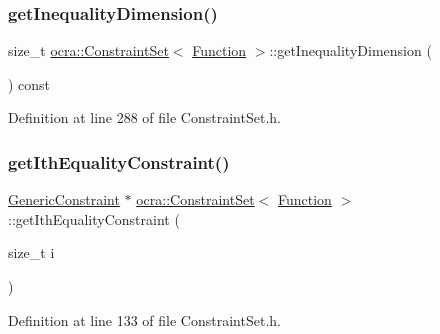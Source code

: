 \subsubsection{\texorpdfstring{get\+Inequality\+Dimension()}{getInequalityDimension()}}
{\footnotesize\ttfamily size\+\_\+t \hyperlink{classocra_1_1ConstraintSet}{ocra\+::\+Constraint\+Set}$<$ \hyperlink{classocra_1_1Function}{Function} $>$\+::get\+Inequality\+Dimension (\begin{DoxyParamCaption}{ }\end{DoxyParamCaption}) const\hspace{0.3cm}{\ttfamily [inline]}}



Definition at line 288 of file Constraint\+Set.\+h.

\hypertarget{classocra_1_1ConstraintSet_3_01Function_01_4_a376c4fe9b26afe70f176c2913fb870f0}{}\label{classocra_1_1ConstraintSet_3_01Function_01_4_a376c4fe9b26afe70f176c2913fb870f0} 
\subsubsection{\texorpdfstring{get\+Ith\+Equality\+Constraint()}{getIthEqualityConstraint()}}
{\footnotesize\ttfamily \hyperlink{namespaceocra_af10341108ce661566aad00908668e2b1}{Generic\+Constraint} $\ast$ \hyperlink{classocra_1_1ConstraintSet}{ocra\+::\+Constraint\+Set}$<$ \hyperlink{classocra_1_1Function}{Function} $>$\+::get\+Ith\+Equality\+Constraint (\begin{DoxyParamCaption}\item[{size\+\_\+t}]{i }\end{DoxyParamCaption})\hspace{0.3cm}{\ttfamily [inline]}}



Definition at line 133 of file Constraint\+Set.\+h.

\hypertarget{classocra_1_1ConstraintSet_3_01Function_01_4_ae105fbee1e6f91fd6b2f8657b72d2511}{}\label{classocra_1_1ConstraintSet_3_01Function_01_4_ae105fbee1e6f91fd6b2f8657b72d2511} 
